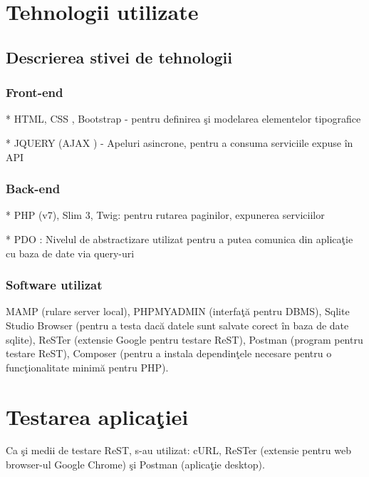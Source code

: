 \documentclass{report}
\begin{document}
\chapter{Tehnologii utilizate}

\section{Descrierea stivei de tehnologii}

\subsection{Front-end}

* HTML, CSS \cite{Duckett2011}, Bootstrap - pentru definirea \c si modelarea elementelor tipografice

* JQUERY \cite{York2015-ud} \cite{Rauschmayer2019-dk} (AJAX \cite{Ford2008-il}) - Apeluri asincrone, pentru a consuma serviciile expuse în API 

\subsection{Back-end}

* PHP \cite{Vaswani2008-ms} (v7), Slim 3, Twig: pentru rutarea paginilor, expunerea serviciilor

* PDO \cite{Vaswani2008-ms}: Nivelul de abstractizare utilizat pentru a putea comunica din aplica\c tie cu baza de date via query-uri

\subsection{Software utilizat}

MAMP (rulare server local), PHPMYADMIN (interfa\c tă pentru DBMS), Sqlite Studio Browser (pentru a testa dacă datele sunt salvate corect în baza de date sqlite), ReSTer (extensie Google pentru testare ReST), Postman (program pentru testare ReST), Composer (pentru a instala dependin\c tele necesare pentru o func\c tionalitate minimă pentru PHP).


\chapter{Testarea aplica\c tiei}

Ca \c si medii de testare ReST, s-au utilizat: cURL, ReSTer (extensie pentru web browser-ul Google Chrome) \c si Postman (aplica\c tie desktop).
\end{document}
